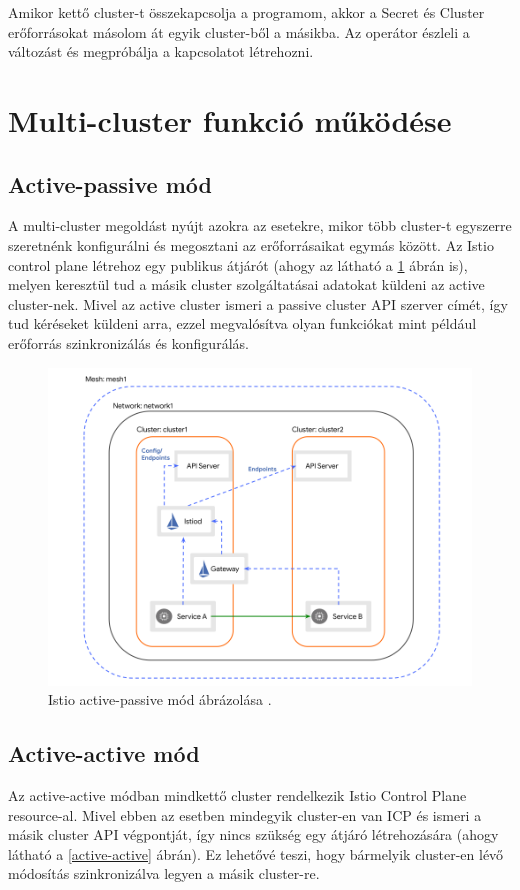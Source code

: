 Amikor kettő cluster-t összekapcsolja a programom, akkor a Secret és Cluster erőforrásokat másolom át egyik cluster-ből a másikba.
Az operátor észleli a változást és megpróbálja a kapcsolatot létrehozni.

\section{Multi-cluster funkció működése}
\subsection*{Active-passive mód}
A multi-cluster megoldást nyújt azokra az esetekre, mikor több cluster-t egyszerre szeretnénk konfigurálni és megosztani az erőforrásaikat egymás között.
Az Istio control plane létrehoz egy publikus átjárót (ahogy az látható a \ref{active-passive} ábrán is), melyen keresztül tud a másik cluster szolgáltatásai adatokat küldeni az active cluster-nek.
Mivel az active cluster ismeri a passive cluster API szerver címét, így tud kéréseket küldeni arra, ezzel megvalósítva olyan funkciókat mint például erőforrás szinkronizálás és konfigurálás.
\begin{figure}[ht]
  \centering
       \includegraphics[width=1.0\textwidth]{figures/kli/active-passive.png}
        \caption{Istio active-passive mód ábrázolása \cite{istioap}.}
         \label{active-passive}
\end{figure}

\subsection*{Active-active mód}
Az active-active módban mindkettő cluster rendelkezik Istio Control Plane resource-al.
Mivel ebben az esetben mindegyik cluster-en van ICP és ismeri a másik cluster API végpontját, így nincs szükség egy átjáró létrehozására (ahogy látható a \ref{active-active} ábrán).
Ez lehetővé teszi, hogy bármelyik cluster-en lévő módosítás szinkronizálva legyen a másik cluster-re.


